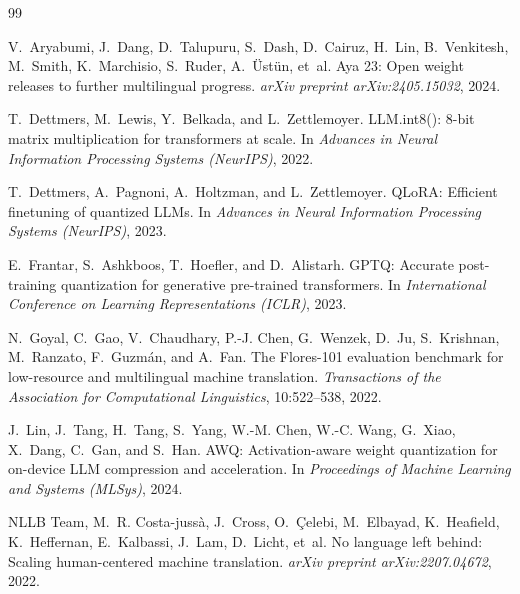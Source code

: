\documentclass[11pt,a4paper]{article}
\begin{document}
\begin{thebibliography}{99}

V.~Aryabumi, J.~Dang, D.~Talupuru, S.~Dash, D.~Cairuz, H.~Lin,
B.~Venkitesh, M.~Smith, K.~Marchisio, S.~Ruder, A.~{\"U}st{\"u}n, et~al.
\newblock Aya 23: Open weight releases to further multilingual progress.
\newblock \emph{arXiv preprint arXiv:2405.15032}, 2024.

T.~Dettmers, M.~Lewis, Y.~Belkada, and L.~Zettlemoyer.
\newblock LLM.int8(): 8-bit matrix multiplication for transformers at scale.
\newblock In \emph{Advances in Neural Information Processing Systems
(NeurIPS)}, 2022.

T.~Dettmers, A.~Pagnoni, A.~Holtzman, and L.~Zettlemoyer.
\newblock QLoRA: Efficient finetuning of quantized LLMs.
\newblock In \emph{Advances in Neural Information Processing Systems
(NeurIPS)}, 2023.

E.~Frantar, S.~Ashkboos, T.~Hoefler, and D.~Alistarh.
\newblock GPTQ: Accurate post-training quantization for generative
pre-trained transformers.
\newblock In \emph{International Conference on Learning Representations
(ICLR)}, 2023.

N.~Goyal, C.~Gao, V.~Chaudhary, P.-J. Chen, G.~Wenzek, D.~Ju,
S.~Krishnan, M.~Ranzato, F.~Guzm{\'a}n, and A.~Fan.
\newblock The Flores-101 evaluation benchmark for low-resource and
multilingual machine translation.
\newblock \emph{Transactions of the Association for Computational
Linguistics}, 10:522--538, 2022.

J.~Lin, J.~Tang, H.~Tang, S.~Yang, W.-M. Chen, W.-C. Wang, G.~Xiao,
X.~Dang, C.~Gan, and S.~Han.
\newblock AWQ: Activation-aware weight quantization for on-device LLM
compression and acceleration.
\newblock In \emph{Proceedings of Machine Learning and Systems
(MLSys)}, 2024.

NLLB Team, M.~R. Costa-juss{\`a}, J.~Cross, O.~{\c{C}}elebi, M.~Elbayad,
K.~Heafield, K.~Heffernan, E.~Kalbassi, J.~Lam, D.~Licht, et~al.
\newblock No language left behind: Scaling human-centered machine
translation.
\newblock \emph{arXiv preprint arXiv:2207.04672}, 2022.


\end{thebibliography}
\end{document}
